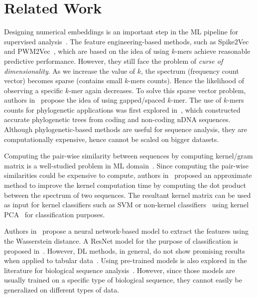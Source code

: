 \documentclass[runningheads]{llncs}
\begin{document}
\section{Related Work}\label{sec_related_work}
Designing numerical embeddings is an important step in the ML pipeline for supervised analysis~\cite{ali2022efficient,ullah2020effect}.
The feature engineering-based methods, such as Spike2Vec~\cite{ali2021spike2vec} and PWM2Vec~\cite{ali2022pwm2vec}, which are based on the idea of using $k$-mers achieve reasonable predictive performance. However, they still face the problem of \textit{curse of dimensionality}. As we increase the value of $k$, the spectrum (frequency count vector) becomes sparse (contains small $k$-mers counts). Hence the likelihood of observing a specific $k$-mer again decreases.
To solve this sparse vector problem, authors in~\cite{ghandi2014robust} propose the idea of using gapped/spaced $k$-mer. 
The use of $k$-mers counts for phylogenetic applications was first explored in~\cite{Blaisdell1986AMeasureOfSimilarity}, which constructed accurate phylogenetic trees from coding and non-coding nDNA sequences. Although phylogenetic-based methods are useful for sequence analysis, they are computationally expensive, hence cannot be scaled on bigger datasets.

Computing the pair-wise similarity between sequences by computing kernel/gram matrix is a well-studied problem in ML domain~\cite{ali2021k}. Since computing the pair-wise similarities could be expensive to compute, authors in~\cite{farhan2017efficient} proposed an approximate method to improve the kernel computation time by computing the dot product between the spectrum of two sequences. The resultant kernel matrix can be used as input for kernel classifiers such as SVM or non-kernel classifiers~\cite{ali2021k} using kernel PCA~\cite{hoffmann2007kernel} for classification purposes. 

Authors in~\cite{shen2018wasserstein} propose a neural network-based model to
extract the features using the Wasserstein distance. 
A ResNet model for the purpose of classification is proposed in~\cite{wang2017time}.
However, DL methods, in general, do not show promising results when applied to tabular data~\cite{shwartz2022tabular}.
Using pre-trained models is also explored in the literature for biological sequence analysis~\cite{heinzinger2019modeling,brandes2022proteinbert}. 
However, since those models are usually trained on a specific type of biological sequence, they cannot easily be generalized on different types of data.
\end{document}

